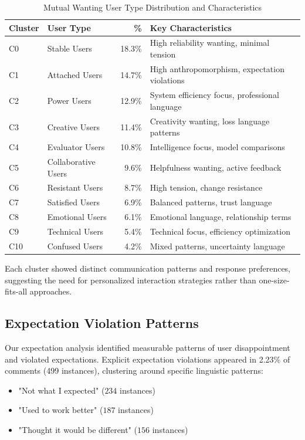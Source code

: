 \documentclass{article}
\begin{document}
\begin{table}[htbp]
\centering
\caption{Mutual Wanting User Type Distribution and Characteristics}
\label{tab:user_clusters}
\begin{tabular}{@{}llrp{5cm}@{}}
\toprule
Cluster & User Type & \% & Key Characteristics \\
\midrule
C0 & Stable Users & 18.3\% & High reliability wanting, minimal tension \\
C1 & Attached Users & 14.7\% & High anthropomorphism, expectation violations \\
C2 & Power Users & 12.9\% & System efficiency focus, professional language \\
C3 & Creative Users & 11.4\% & Creativity wanting, loss language patterns \\
C4 & Evaluator Users & 10.8\% & Intelligence focus, model comparisons \\
C5 & Collaborative Users & 9.6\% & Helpfulness wanting, active feedback \\
C6 & Resistant Users & 8.7\% & High tension, change resistance \\
C7 & Satisfied Users & 6.9\% & Balanced patterns, trust language \\
C8 & Emotional Users & 6.1\% & Emotional language, relationship terms \\
C9 & Technical Users & 5.4\% & Technical focus, efficiency optimization \\
C10 & Confused Users & 4.2\% & Mixed patterns, uncertainty language \\
\bottomrule
\end{tabular}
\end{table}

Each cluster showed distinct communication patterns and response preferences, suggesting the need for personalized interaction strategies rather than one-size-fits-all approaches.

\subsection{Expectation Violation Patterns}

Our expectation analysis identified measurable patterns of user disappointment and violated expectations. Explicit expectation violations appeared in 2.23\% of comments (499 instances), clustering around specific linguistic patterns:

\begin{itemize}
    \item "Not what I expected" ($234$ instances)
    \item "Used to work better" ($187$ instances)  
    \item "Thought it would be different" ($156$ instances)
\end{itemize}
\end{document}
